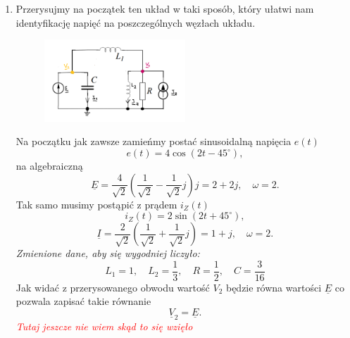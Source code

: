 \documentclass[12pt, a4paper]{article}
\begin{document}
\begin{enumerate}[label=\alph*)]
  \item Przerysujmy na początek ten układ w taki sposób, który ułatwi nam identyfikację
        napięć na poszczególnych węzłach układu.
        \begin{figure}[H]
          \centering
          \includegraphics[width = 0.5\textwidth]{./images/Lista_3/3.4.1.png}
        \end{figure}
        Na początku jak zawsze zamieńmy postać sinusoidalną napięcia $e(t)$
        \begin{equation*}
          e(t) = 4\cos(2t-45^\circ),
        \end{equation*}
        na algebraiczną
        \begin{equation*}
          \underline{E} = \frac{4}{\sqrt{2}}\left(\frac{1}{\sqrt{2}}-
          \frac{1}{\sqrt{2}}j\right)j = 2+2j, \quad \omega = 2.
        \end{equation*}
        Tak samo musimy postąpić z prądem $i_Z(t)$
        \begin{equation*}
          i_Z(t) = 2\sin(2t+45^\circ),
        \end{equation*}
        \begin{equation*}
          \underline{I} = \frac{2}{\sqrt{2}}\left(\frac{1}{\sqrt{2}}+
          \frac{1}{\sqrt{2}}j\right) = 1 + j, \quad \omega = 2.
        \end{equation*}
        \textit{Zmienione dane, aby się wygodniej liczyło:}
        \begin{equation*}
          L_1 = 1, \quad L_2 = \frac{1}{3}, \quad R = \frac{1}{2}, \quad
          C = \frac{3}{16}
        \end{equation*}
        Jak widać z przerysowanego obwodu wartość $V_2$ będzie równa wartości $\underline{E}$
        co pozwala zapisać takie równanie
        \begin{equation}\label{3.4a_V2}
          \underline{V}_2 = \underline{E}.
        \end{equation}
        \textit{\textcolor{Red}{Tutaj jeszcze nie wiem skąd to się wzięło}}
        \begin{equation}\label{3.4_IZ}

\end{equation}
\end{enumerate}
\end{document}
